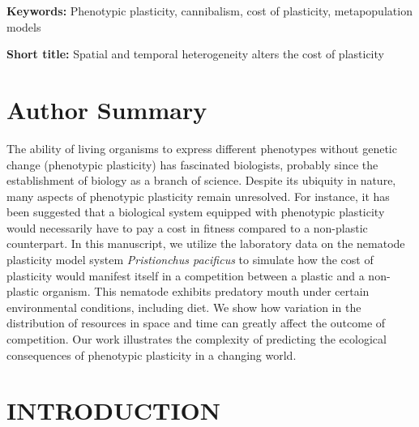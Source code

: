 \documentclass[10pt,letterpaper]{article}
\begin{document}
\hspace{5cm}

\noindent
\textbf{Keywords:} Phenotypic plasticity, cannibalism, cost of plasticity, metapopulation models

\noindent
\textbf{Short title:} Spatial and temporal heterogeneity alters the cost of plasticity 

\section*{Author Summary}

The ability of living organisms to express different phenotypes without genetic change (phenotypic plasticity) has fascinated biologists, probably since the establishment of biology as a branch of science. Despite its ubiquity in nature, many aspects of phenotypic plasticity remain unresolved. For instance, it has been suggested that a biological system equipped with phenotypic plasticity would necessarily have to pay a cost in fitness compared to a non-plastic counterpart. In this manuscript, we utilize the laboratory data on the nematode plasticity model system \emph{Pristionchus pacificus} to simulate how the cost of plasticity would manifest itself in a competition between a plastic and a non-plastic organism. This nematode exhibits predatory mouth under certain environmental conditions, including diet. We show how variation in the distribution of resources in space and time can greatly affect the outcome of competition. Our work illustrates the complexity of predicting the ecological consequences of phenotypic plasticity in a changing world. 
\linenumbers




\section*{INTRODUCTION}

\end{document}
